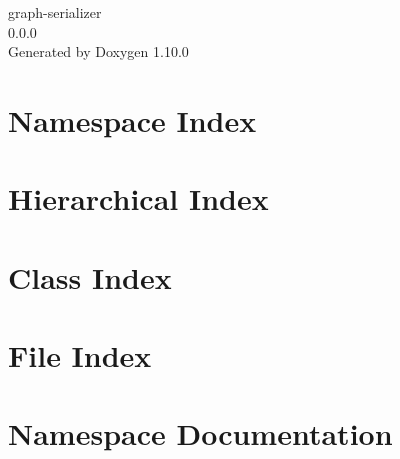\documentclass[twoside]{book}
\newcommand{\+}{\discretionary{\mbox{\scriptsize$\hookleftarrow$}}{}{}}
\newcommand{\clearemptydoublepage}{%
    \newpage{\pagestyle{empty}\cleardoublepage}%
  }
\begin{document}
  \raggedbottom
    \hypersetup{pageanchor=false,
                bookmarksnumbered=true,
                pdfencoding=unicode
               }
  \begin{titlepage}
  \vspace*{7cm}
  \begin{center}%
  {\Large graph-\/serializer}\\
  [1ex]\large 0.\+0.\+0 \\
  \vspace*{1cm}
  {\large Generated by Doxygen 1.10.0}\\
  \end{center}
  \end{titlepage}
  \clearemptydoublepage
  \tableofcontents
  \clearemptydoublepage
  \hypersetup{pageanchor=true}
\chapter{Namespace Index}

\chapter{Hierarchical Index}

\chapter{Class Index}

\chapter{File Index}

\chapter{Namespace Documentation}

\end{document}
